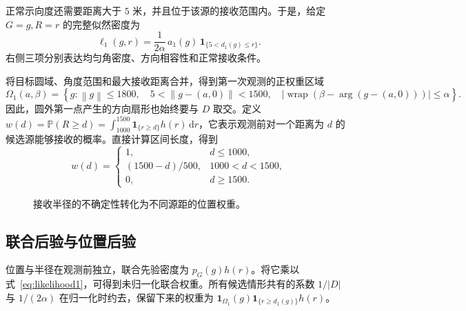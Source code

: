 \documentclass[UTF8,a4paper,zihao=-4,fontset=none]{ctexart}
\numberwithin{equation}{section}
\newcommand{\ind}{\mathbf 1}
\newcommand{\dd}{\,\mathrm d}
\newcommand{\Prob}{\mathbb P}
\newcommand{\norm}[1]{\left\lVert#1\right\rVert}
\newcommand{\wrap}{\operatorname{wrap}}
\begin{document}
正常示向度还需要距离大于 \(5\) 米，并且位于该源的接收范围内。于是，给定 \(G=g,R=r\) 的完整似然密度为
\begin{equation}\label{eq:likelihood1}
\ell_1(g,r)=\frac{1}{2\alpha}\,a_1(g)\,\ind_{\{5<d_1(g)\le r\}}.
\end{equation}
右侧三项分别表达均匀角密度、方向相容性和正常接收条件。

将目标圆域、角度范围和最大接收距离合并，得到第一次观测的正权重区域
\begin{equation}\label{eq:omega-ab}
\Omega_1(a,\beta)=\left\{g:\norm{g}\le1800,\quad 5<\norm{g-(a,0)}<1500,\quad
|\wrap(\beta-\arg(g-(a,0)))|\le\alpha\right\}.
\end{equation}
因此，圆外第一点产生的方向扇形也始终要与 \(D\) 取交。定义 \(w(d)=\Prob(R\ge d)=\int_{1000}^{1500}\ind_{\{r\ge d\}}h(r)\dd r\)，它表示观测前对一个距离为 \(d\) 的候选源能够接收的概率。直接计算区间长度，得到
\begin{equation}\label{eq:tail}
 w(d)=
 \begin{cases}
 1,&d\le1000,\\
 (1500-d)/500,&1000<d<1500,\\
 0,&d\ge1500.
 \end{cases}
\end{equation}

\begin{figure}[H]\centering
{}
\caption{接收半径的不确定性转化为不同源距的位置权重。}
\end{figure}

\subsection{联合后验与位置后验}
位置与半径在观测前独立，联合先验密度为 \(p_G(g)h(r)\)。将它乘以式~\eqref{eq:likelihood1}，可得到未归一化联合权重。所有候选情形共有的系数 \(1/|D|\) 与 \(1/(2\alpha)\) 在归一化时约去，保留下来的权重为 \(\ind_{\Omega_1}(g)\ind_{\{r\ge d_1(g)\}}h(r)\)。
\end{document}
